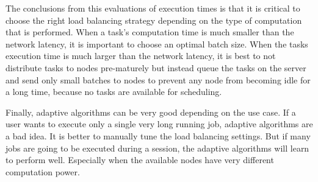 \documentclass[english]{uzhpub}
\begin{document}
The conclusions from this evaluations of execution times is that it is critical to choose the right load balancing strategy depending on the type of computation that is performed. When a task's computation time is much smaller than the network latency, it is important to choose an optimal batch size. When the tasks execution time is much larger than the network latency, it is best to not distribute tasks to nodes pre-maturely but instead queue the tasks on the server and send only small batches to nodes to prevent any node from becoming idle for a long time, because no tasks are available for scheduling.

Finally, adaptive algorithms can be very good depending on the use case. If a user wants to execute only a single very long running job, adaptive algorithms are a bad idea. It is better to manually tune the load balancing settings. But if many jobs are going to be executed during a session, the adaptive algorithms will learn to perform well. Especially when the available nodes have very different computation power.
\end{document}
